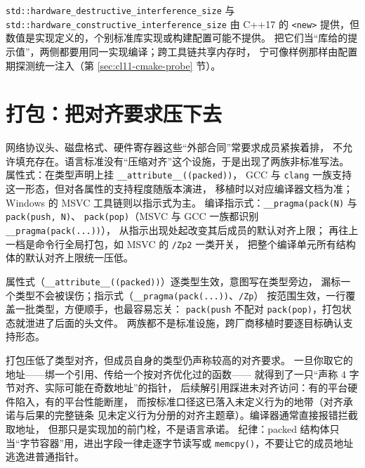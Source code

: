 \documentclass[12pt,a4paper,fontset=fandol]{ctexbook}
\newcommand{\cpp}[1]{C++#1}
\newcommand{\Fn}[1]{\texttt{#1()}}
\newcommand{\Tp}[1]{\texttt{#1}}
\newcommand{\Bk}{\discretionary{}{}{}}
\newcommand{\Tool}[1]{\texttt{#1}}
\newcommand{\Sw}[1]{\texttt{#1}}
\newcommand{\Win}{\textsf{Windows}}
\begin{document}
\begin{note}[title={标准常量的可用性}]
\Tp{std::hardware{\Bk}\_destructive{\Bk}\_interference{\Bk}\_size} 与
\Tp{std::hardware{\Bk}\_constructive{\Bk}\_interference{\Bk}\_size} 由 \cpp{17}
的 \Tp{<new>} 提供，但数值是实现定义的，个别标准库实现或构建配置可能不提供。
把它们当“库给的提示值”，两侧都要用同一实现编译；跨工具链共享内存时，
宁可像样例那样由配置期探测统一注入（第 \ref{sec:cl11-cmake-probe} 节）。
\end{note}

\section{打包：把对齐要求压下去}\label{sec:cl11-packing}

网络协议头、磁盘格式、硬件寄存器这些“外部合同”常要求成员紧挨着排，
不允许填充存在。语言标准没有“压缩对齐”这个设施，于是出现了两族非标准写法。
属性式：在类型声明上挂 \Tp{\_\_attribute\_\_((packed))}，
GCC 与 \Tool{clang} 一族支持这一形态，但对各属性的支持程度随版本演进，
移植时以对应编译器文档为准；\Win{} 的 MSVC 工具链则以指示式为主。
编译指示式：\Tp{\_\_pragma(pack(N)} 与 \Tp{pack(push, N)}、
\Tp{pack(pop)}（MSVC 与 GCC 一族都识别 \Tp{\_\_pragma(pack(...))}），
从指示出现处起改变其后成员的默认对齐上限；
再往上一档是命令行全局打包，如 MSVC 的 \Sw{/Zp2} 一类开关，
把整个编译单元所有结构体的默认对齐上限统一压低。

\begin{compare}[title={属性式与指示式：两种打包写法}]
属性式（\Tp{\_\_attribute\_\_((packed))}）逐类型生效，意图写在类型旁边，
漏标一个类型不会被误伤；指示式（\Tp{\_\_pragma(pack(...))}、\Sw{/Zp}）
按范围生效，一行覆盖一批类型，方便顺手，也最容易忘关：
\Tp{pack(push} 不配对 \Tp{pack(pop)}，打包状态就泄进了后面的头文件。
两族都不是标准设施，跨厂商移植时要逐目标确认支持形态。
\end{compare}

\begin{warning}[title={取 packed 成员地址在语言层就有问题}]
打包压低了类型对齐，但成员自身的类型仍声称较高的对齐要求。
一旦你取它的地址——绑一个引用、传给一个按对齐优化过的函数——
就得到了一只“声称 4 字节对齐、实际可能在奇数地址”的指针，
后续解引用踩进未对齐访问：有的平台硬件陷入，有的平台性能断崖，
而按标准口径这已落入未定义行为的地带（对齐承诺与后果的完整链条
见未定义行为分册的对齐主题章）。编译器通常直接报错拦截取地址，
但那只是实现加的前门栓，不是语言承诺。
纪律：packed 结构体只当“字节容器”用，进出字段一律走逐字节读写或
\Fn{memcpy}，不要让它的成员地址逃逸进普通指针。
\end{warning}
\end{document}
